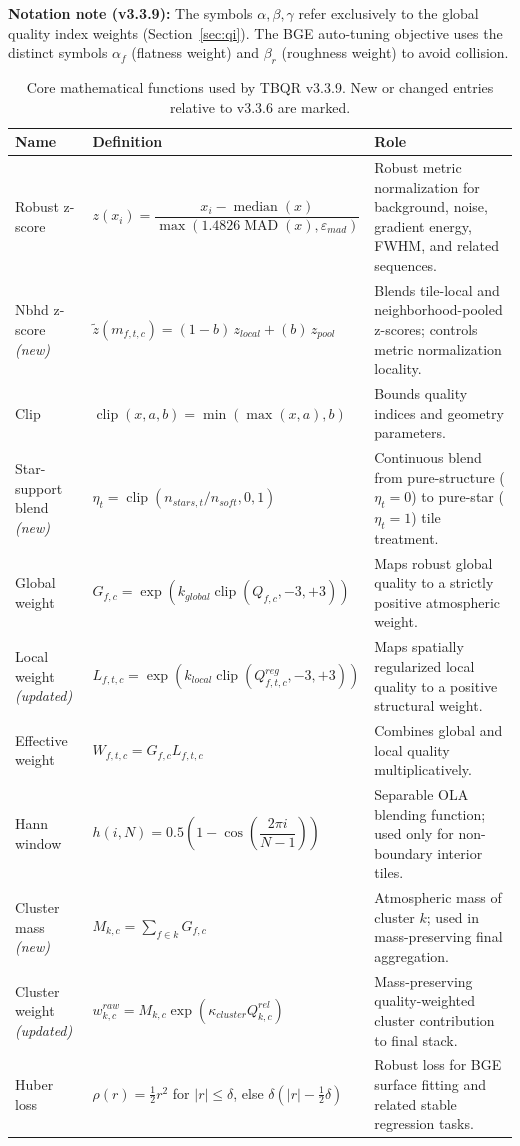 \documentclass[10pt,twocolumn]{article}
\begin{document}
\textbf{Notation note (v3.3.9):} The symbols $\alpha,\beta,\gamma$ refer exclusively to the global
quality index weights (Section~\ref{sec:qi}). The BGE auto-tuning objective uses the distinct
symbols $\alpha_f$ (flatness weight) and $\beta_r$ (roughness weight) to avoid collision.

\begin{table}[t]
\centering
\caption{Core mathematical functions used by TBQR v3.3.9. New or changed entries relative to v3.3.6 are marked.}
\begin{tabularx}{\textwidth}{>{\raggedright\arraybackslash}p{} >{\raggedright\arraybackslash}p{} X}
\toprule
\textbf{Name} & \textbf{Definition} & \textbf{Role} \\
\midrule
Robust z-score &
$z(x_i)=\dfrac{x_i-\operatorname{median}(x)}{\max(1.4826\operatorname{MAD}(x),\varepsilon_{mad})}$ &
Robust metric normalization for background, noise, gradient energy, FWHM, and related sequences. \\
\addlinespace
Nbhd z-score \textit{(new)} &
$\tilde{z}(m_{f,t,c})=(1-b)\,z_{local}+(b)\,z_{pool}$ &
Blends tile-local and neighborhood-pooled z-scores; controls metric normalization locality. \\
\addlinespace
Clip &
$\operatorname{clip}(x,a,b)=\min(\max(x,a),b)$ &
Bounds quality indices and geometry parameters. \\
\addlinespace
Star-support blend \textit{(new)} &
$\eta_t=\operatorname{clip}(n_{stars,t}/n_{soft},0,1)$ &
Continuous blend from pure-structure ($\eta_t=0$) to pure-star ($\eta_t=1$) tile treatment. \\
\addlinespace
Global weight &
$G_{f,c}=\exp(k_{global}\operatorname{clip}(Q_{f,c},-3,+3))$ &
Maps robust global quality to a strictly positive atmospheric weight. \\
\addlinespace
Local weight \textit{(updated)} &
$L_{f,t,c}=\exp(k_{local}\operatorname{clip}(Q_{f,t,c}^{reg},-3,+3))$ &
Maps spatially regularized local quality to a positive structural weight. \\
\addlinespace
Effective weight &
$W_{f,t,c}=G_{f,c}L_{f,t,c}$ &
Combines global and local quality multiplicatively. \\
\addlinespace
Hann window &
$h(i,N)=0.5\!\left(1-\cos\!\left(\dfrac{2\pi i}{N-1}\right)\right)$ &
Separable OLA blending function; used only for non-boundary interior tiles. \\
\addlinespace
Cluster mass \textit{(new)} &
$M_{k,c}=\sum_{f\in k}G_{f,c}$ &
Atmospheric mass of cluster $k$; used in mass-preserving final aggregation. \\
\addlinespace
Cluster weight \textit{(updated)} &
$w_{k,c}^{raw}=M_{k,c}\exp(\kappa_{cluster}Q_{k,c}^{rel})$ &
Mass-preserving quality-weighted cluster contribution to final stack. \\
\addlinespace
Huber loss &
$\rho(r)=\frac{1}{2}r^2$ for $|r|\le\delta$, else $\delta(|r|-\frac{1}{2}\delta)$ &
Robust loss for BGE surface fitting and related stable regression tasks. \\
\bottomrule
\end{tabularx}
\label{tab:functions}
\end{table}
\end{document}
